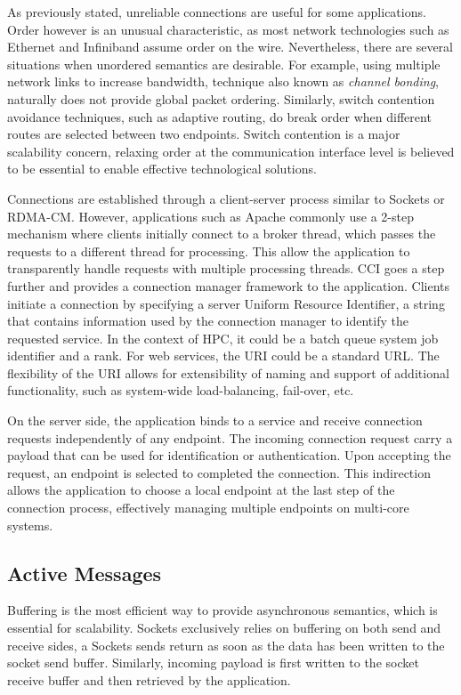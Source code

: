 As previously stated, unreliable connections are useful for some applications. 
Order however is an unusual characteristic, as most network technologies such 
as Ethernet and Infiniband assume order on the wire. 
Nevertheless, there are several situations when unordered semantics are 
desirable. For example, using multiple network links to increase bandwidth, 
technique also known as \emph{channel bonding}, naturally does not provide 
global packet ordering. Similarly, switch contention avoidance techniques, 
such as adaptive routing, do break order when different routes are selected 
between two endpoints. Switch contention is a major scalability concern, 
relaxing order at the communication interface level is believed to be 
essential to enable effective technological solutions.

Connections are established through a client-server process similar to 
Sockets or RDMA-CM. However, applications such as 
Apache commonly use a 2-step mechanism where clients 
initially connect to a broker thread, which passes the requests to a 
different thread for processing. This allow the application to 
transparently handle requests with multiple processing threads.
CCI goes a step further and provides a connection manager framework to 
the application. Clients initiate a connection by specifying a server 
Uniform Resource Identifier, a string that contains information used 
by the connection manager to identify the requested service. In the context of 
HPC, it could be a batch queue system job identifier and a rank. For web 
services, the URI could be a standard URL. The flexibility of the URI allows 
for extensibility of naming and support of additional functionality, such as 
system-wide load-balancing, fail-over, etc.

On the server side, the application binds to a service and receive 
connection requests independently of any endpoint. The incoming connection 
request carry a payload that can be used for identification or authentication. 
Upon accepting the request, an endpoint is selected to completed the 
connection. This indirection allows the application to choose a local endpoint 
at the last step of the connection process, effectively managing multiple 
endpoints on multi-core systems.

\subsection{Active Messages}
Buffering is the most efficient way to provide asynchronous semantics, which 
is essential for scalability. Sockets exclusively relies on buffering on both 
send and receive sides, a Sockets sends return as soon as the data has been 
written to the socket send buffer. Similarly, incoming payload is first 
written to the socket receive buffer and then retrieved by the application.

